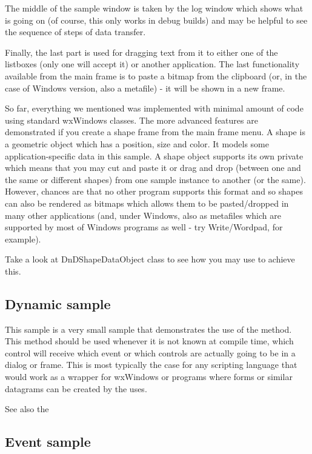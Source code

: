 The middle of the sample window is taken by the log window which shows what is
going on (of course, this only works in debug builds) and may be helpful to see
the sequence of steps of data transfer.

Finally, the last part is used for dragging text from it to either one of the
listboxes (only one will accept it) or another application. The last
functionality available from the main frame is to paste a bitmap from the
clipboard (or, in the case of Windows version, also a metafile) - it will be
shown in a new frame.

So far, everything we mentioned was implemented with minimal amount of code
using standard wxWindows classes. The more advanced features are demonstrated
if you create a shape frame from the main frame menu. A shape is a geometric
object which has a position, size and color. It models some
application-specific data in this sample. A shape object supports its own
private  which means that you may cut and
paste it or drag and drop (between one and the same or different shapes) from
one sample instance to another (or the same). However, chances are that no
other program supports this format and so shapes can also be rendered as
bitmaps which allows them to be pasted/dropped in many other applications
(and, under Windows, also as metafiles which are supported by most of Windows
programs as well - try Write/Wordpad, for example).

Take a look at DnDShapeDataObject class to see how you may use 
 to achieve this.

\subsection{Dynamic sample}\label{sampledynamic}

This sample is a very small sample that demonstrates the use of the
 method. This method
should be used whenever it is not known at compile time, which control
will receive which event or which controls are actually going to be in
a dialog or frame. This is most typically the case for any scripting
language that would work as a wrapper for wxWindows or programs where
forms or similar datagrams can be created by the uses.

See also the 

\subsection{Event sample}\label{sampleevent}

